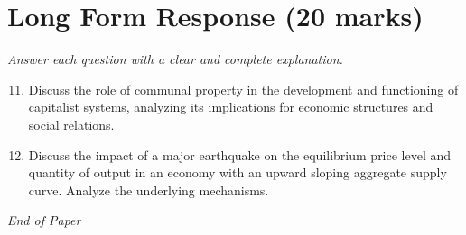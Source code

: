 \documentclass[12pt]{article}
\begin{document}
\section*{Long Form Response (20 marks)}
\textit{Answer each question with a clear and complete explanation.}
\begin{enumerate}[label=\arabic*.]
\setcounter{enumi}{10}
\item Discuss the role of communal property in the development and functioning of capitalist systems, analyzing its implications for economic structures and social relations.
\item Discuss the impact of a major earthquake on the equilibrium price level and quantity of output in an economy with an upward sloping aggregate supply curve. Analyze the underlying mechanisms.
\end{enumerate}

\vfill
\noindent\textit{End of Paper}
\end{document}
